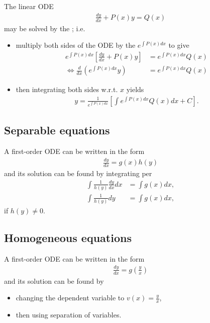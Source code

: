 \documentclass{article}
\begin{document}
\begin{theorem}
    The linear ODE
    \begin{align*}
        \frac{dy}{dx}+P(x)y = Q(x)
    \end{align*}
    may be solved by the ; i.e.
    \begin{itemize}
        \item multiply both sides of the ODE by the  $e^{\int P(x)dx}$ to give\begin{align*}
            e^{\int P(x)dx}\left[\frac{dy}{dx}+P(x)y\right]&= e^{\int P(x)dx}Q(x)\\
            \Leftrightarrow \frac{d}{dx}\left(e^{\int P(x)dx}y\right)&=e^{\int P(x)dx}Q(x)
        \end{align*}
        \item then integrating both sides w.r.t. $x$ yields \begin{align*}
            y = \frac{1}{e^{\int P(x)dx}}\left[\int e^{\int P(x)dx}Q(x)dx + C\right].
        \end{align*}
    \end{itemize}
\end{theorem}


\subsection{Separable equations}


\begin{theorem}
    A  first-order ODE can be written in the form
    \begin{align*}
        \frac{dy}{dx}=g(x)h(y)
    \end{align*}
    and its solution can be found by integrating per
    \begin{align*}
        \int \frac{1}{h(y)}\frac{dy}{dx}dx &= \int g(x)dx, \\
        \int \frac{1}{h(y)}dy &= \int g(x)dx,
    \end{align*}
    if $h(y)\not=0$.
\end{theorem}


\subsection{Homogeneous equations}


\begin{theorem}
    A  first-order ODE can be written in the form
    \begin{align*}
        \frac{dy}{dx} = g\left(\frac{y}{x}\right)
    \end{align*}
    and its solution can be found by
    \begin{itemize}
        \item changing the dependent variable to $v(x)=\frac{y}{x}$,
        \item then using separation of variables.
    \end{itemize}
\end{theorem}
\end{document}
